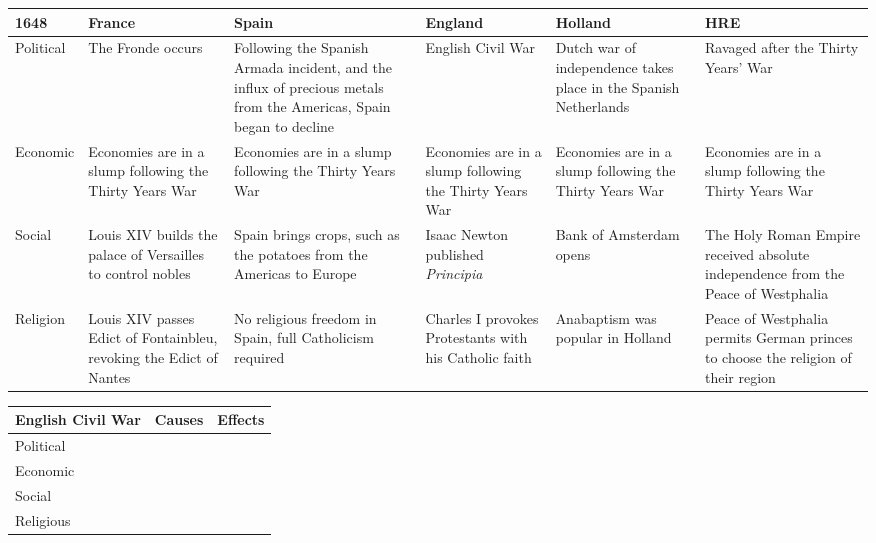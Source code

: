 \documentclass[12pt]{article}
\begin{document}
\begin{enumerate}
\begin{tabular}{|p{}|p{}|p{}|p{}|p{}|p{}|}
\hline
1648 & France & Spain & England & Holland & HRE \\
\hline
Political & The Fronde occurs & Following the Spanish Armada incident, and the influx of precious metals from the Americas, Spain began to decline & English Civil War & Dutch war of independence takes place in the Spanish Netherlands & Ravaged after the Thirty Years' War \\
\hline
Economic & Economies are in a slump following the Thirty Years War & Economies are in a slump following the Thirty Years War & Economies are in a slump following the Thirty Years War & Economies are in a slump following the Thirty Years War &  Economies are in a slump following the Thirty Years War \\
\hline
Social & Louis XIV builds the palace of Versailles to control nobles & Spain brings crops, such as the potatoes from the Americas to Europe & Isaac Newton published \textit{Principia} & Bank of Amsterdam opens & The Holy Roman Empire received absolute independence from the Peace of Westphalia  \\
\hline
Religion & Louis XIV passes Edict of Fontainbleu, revoking the Edict of Nantes & No religious freedom in Spain, full Catholicism required & Charles I provokes Protestants with his Catholic faith & Anabaptism was popular in Holland & Peace of Westphalia permits German princes to choose the religion of their region \\
\hline


\end{tabular}

\hspace{-25pt} \begin{tabular}{|p{}|p{}|p{}|}

\hline
English Civil War & Causes & Effects \\
\hline
Political & & \\
\hline
Economic & & \\
\hline
Social & & \\
\hline
Religious & & \\
\hline

\end{tabular}

\hspace{-25pt} \begin{tabular}{|p{}|p{}|p{}|}


\end{tabular}
\end{enumerate}
\end{document}
